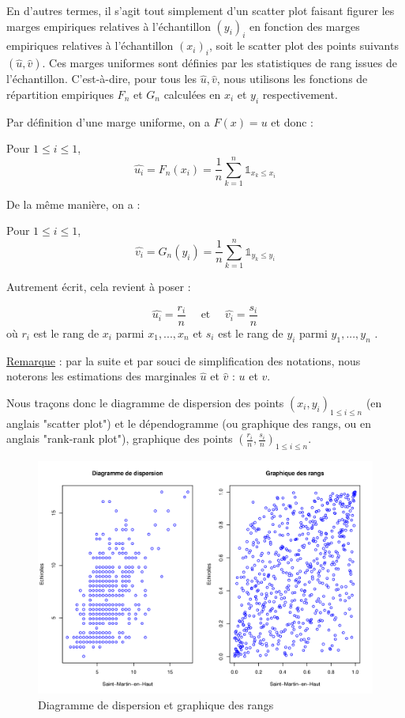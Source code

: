 En d'autres termes, il s'agit tout simplement d'un scatter plot faisant figurer les marges empiriques relatives à l'échantillon
$(y_i )_i$ en fonction des marges empiriques relatives à l'échantillon $(x_i)_i$, soit le scatter plot des points suivants $(\hat{u},\hat{v})$.
Ces marges uniformes sont définies par les statistiques de rang issues de l'échantillon. C'est-à-dire, pour tous les $\hat{u}, \hat{v}$, nous utilisons 
les fonctions de répartition empiriques $F_n$ et $G_n$ calculées en $x_i$ et $y_i$ respectivement.

Par définition d'une marge uniforme, on a $F(x) = u$ et donc : 


Pour $1\leq i \leq 1$,
$$
\widehat{u_i} = F_n(x_i) = \frac{1}{n} \sum_{k=1}^n \mathbb{1}_{x_k \leq x_i}
$$

De la même manière, on a :

Pour $1\leq i \leq 1$,
$$
\widehat{v_i} = G_n(y_i) = \frac{1}{n} \sum_{k=1}^n \mathbb{1}_{y_k \leq y_i}
$$

Autrement écrit, cela revient à poser :

$$
\widehat{u_i} = \frac{r_i}{n} \text{~~~~et~~~~} \widehat{v_i} = \frac{s_i}{n}
$$
où $r_i$ est le rang de $x_i$ parmi $x_1,...,x_n$ et $s_i$ est le rang de $y_i$ parmi $y_1,...,y_n$ .

\underline{Remarque} : par la suite et par souci de simplification des notations, nous noterons les estimations des marginales $\widehat{u}$ 
et $\widehat{v}$ : $u$ et $v$.

Nous traçons donc le diagramme de dispersion des points $(x_i,y_i)_{1\leq i \leq n}$ (en anglais "scatter plot") et 
le dépendogramme (ou graphique des rangs, ou en anglais "rank-rank plot"), graphique des points $\left( \frac{r_i}{n}, \frac{s_i}{n}\right)_{1\leq i \leq n}$.

\noindent%
\begin{figure}[H]
    \begin{center}
      \includegraphics[width=17 cm, angle=0]{./pictures/scatter_et_rankrank.png}
      \centering\caption{Diagramme de dispersion et graphique des rangs}
    \end{center}
\end{figure}

